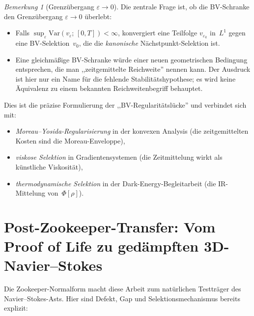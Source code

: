 \documentclass[12pt,a4paper]{article}
\theoremstyle{definition}
\theoremstyle{plain}
\theoremstyle{remark}
\newtheorem{remark}[definition]{Bemerkung}
\newcommand{\Var}{\mathrm{Var}}
\begin{document}
\begin{remark}[Grenzübergang \texorpdfstring{$\varepsilon \to 0$}{epsilon to 0}]
\label{rem:epsilon-limit}
Die zentrale Frage ist, ob die BV-Schranke den Grenzübergang
$\varepsilon \to 0$ überlebt:
\begin{itemize}
\item Falls\; $\sup_\varepsilon \Var(v_\varepsilon;\,[0,T]) < \infty$,
  konvergiert eine Teilfolge $v_{\varepsilon_k}$ in~$L^1$ gegen eine
  BV-Selektion~$v_0$, die die \emph{kanonische} Nächstpunkt-Selektion
  ist.
\item Eine gleichmäßige BV-Schranke würde einer neuen geometrischen
  Bedingung entsprechen, die man ,,zeitgemittelte Reichweite'' nennen
  kann. Der Ausdruck ist hier nur ein Name für die fehlende
  Stabilitätshypothese; es wird keine Äquivalenz zu einem bekannten
  Reichweitenbegriff behauptet.
\end{itemize}
Dies ist die präzise Formulierung der ,,BV-Regularitätslücke'' und
verbindet sich mit:
\begin{itemize}
\item \emph{Moreau--Yosida-Regularisierung} in der konvexen Analysis
  (die zeitgemittelten Kosten sind die Moreau-Enveloppe),
\item \emph{viskose Selektion} in Gradientensystemen (die Zeitmittelung
  wirkt als künstliche Viskosität),
\item \emph{thermodynamische Selektion} in der Dark-Energy-Begleitarbeit
  (die IR-Mittelung von~$\Phi[\rho]$).
\end{itemize}
\end{remark}


\section{Post-Zookeeper-Transfer: Vom Proof of Life zu gedämpften 3D-Navier--Stokes}
\label{sec:zookeeper-ldi-transfer}

Die Zookeeper-Normalform macht diese Arbeit zum natürlichen Testträger
des Navier--Stokes-Asts.  Hier sind Defekt, Gap und Selektionsmechanismus
bereits explizit:
\end{document}
